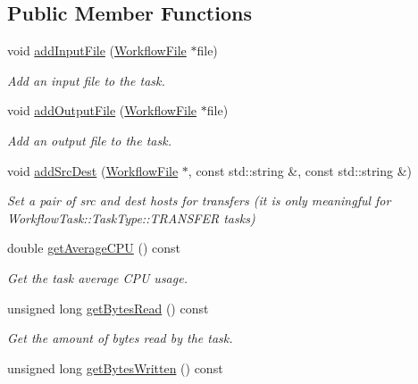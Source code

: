 \subsection*{Public Member Functions}
\begin{DoxyCompactItemize}
\item 
void \hyperlink{classwrench_1_1_workflow_task_a3498047afb74ea6ce2132d44f8c678e8}{add\+Input\+File} (\hyperlink{classwrench_1_1_workflow_file}{Workflow\+File} $\ast$file)
\begin{DoxyCompactList}\small\item\em Add an input file to the task. \end{DoxyCompactList}\item 
void \hyperlink{classwrench_1_1_workflow_task_ac774b4fddc07753f5fc7daa31ae28fd3}{add\+Output\+File} (\hyperlink{classwrench_1_1_workflow_file}{Workflow\+File} $\ast$file)
\begin{DoxyCompactList}\small\item\em Add an output file to the task. \end{DoxyCompactList}\item 
void \hyperlink{classwrench_1_1_workflow_task_a4e32ce5d0da237ad01b8a1c1154bb86e}{add\+Src\+Dest} (\hyperlink{classwrench_1_1_workflow_file}{Workflow\+File} $\ast$, const std\+::string \&, const std\+::string \&)
\begin{DoxyCompactList}\small\item\em Set a pair of src and dest hosts for transfers (it is only meaningful for Workflow\+Task\+::\+Task\+Type\+::\+T\+R\+A\+N\+S\+F\+ER tasks) \end{DoxyCompactList}\item 
double \hyperlink{classwrench_1_1_workflow_task_af00a94dc20c6b2b6028aa13fce7581c6}{get\+Average\+C\+PU} () const
\begin{DoxyCompactList}\small\item\em Get the task average C\+PU usage. \end{DoxyCompactList}\item 
unsigned long \hyperlink{classwrench_1_1_workflow_task_aa058314eed75bf58cbfc86441c9e75cc}{get\+Bytes\+Read} () const
\begin{DoxyCompactList}\small\item\em Get the amount of bytes read by the task. \end{DoxyCompactList}\item 
unsigned long \hyperlink{classwrench_1_1_workflow_task_afe222b599fa4ba072aa6162d9c8287ab}{get\+Bytes\+Written} () const

\end{DoxyCompactItemize}
